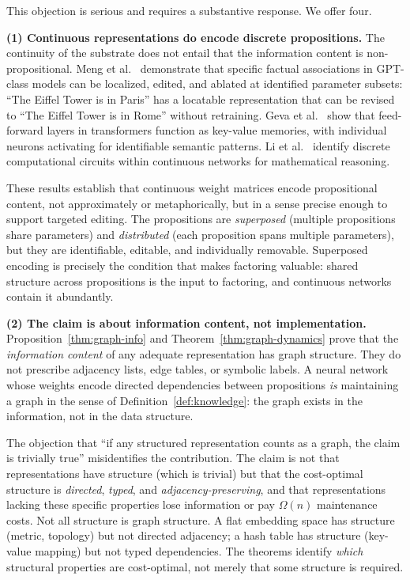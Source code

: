 \documentclass[11pt]{article}
\theoremstyle{definition}
\begin{document}
This objection is serious and requires a substantive response. We offer
four.

\textbf{(1) Continuous representations do encode discrete
propositions.}
The continuity of the substrate does not entail that the information
content is non-propositional. Meng et al.\ \cite{Meng2022} demonstrate
that specific factual associations in GPT-class models can be localized,
edited, and ablated at identified parameter subsets: ``The Eiffel Tower
is in Paris'' has a locatable representation that can be revised to ``The Eiffel Tower is in Rome'' without retraining. Geva
et al.\ \cite{Geva2021} show that feed-forward layers in transformers
function as key-value memories, with individual neurons activating for
identifiable semantic patterns. Li et al.\ \cite{Li2024} identify discrete computational circuits
within continuous networks for mathematical reasoning.

These results establish that continuous weight matrices encode
propositional content, not approximately or metaphorically, but in a
sense precise enough to support targeted editing. The propositions are
\emph{superposed} (multiple propositions share parameters) and
\emph{distributed} (each proposition spans multiple parameters), but
they are identifiable, editable, and individually removable. Superposed
encoding is precisely the condition that makes factoring valuable: shared
structure across propositions is the input to factoring, and continuous
networks contain it abundantly.

\textbf{(2) The claim is about information content, not
implementation.}
Proposition~\ref{thm:graph-info} and Theorem~\ref{thm:graph-dynamics} prove that
the \emph{information content} of any adequate representation has graph
structure. They do not prescribe adjacency lists, edge tables, or
symbolic labels. A neural network whose weights encode directed
dependencies between propositions \emph{is} maintaining a graph in the
sense of Definition~\ref{def:knowledge}: the graph exists in the
information, not in the data structure.

The objection that ``if any structured representation counts as a
graph, the claim is trivially true'' misidentifies the contribution.
The claim is not that representations have structure (which is trivial)
but that the cost-optimal structure is \emph{directed}, \emph{typed}, and
\emph{adjacency-preserving}, and that representations lacking these
specific properties lose information or pay $\Omega(n)$ maintenance
costs. Not all structure is graph structure. A flat embedding space has
structure (metric, topology) but not directed adjacency; a hash table
has structure (key-value mapping) but not typed dependencies. The
theorems identify \emph{which} structural properties are cost-optimal, not
merely that some structure is required.
\end{document}

